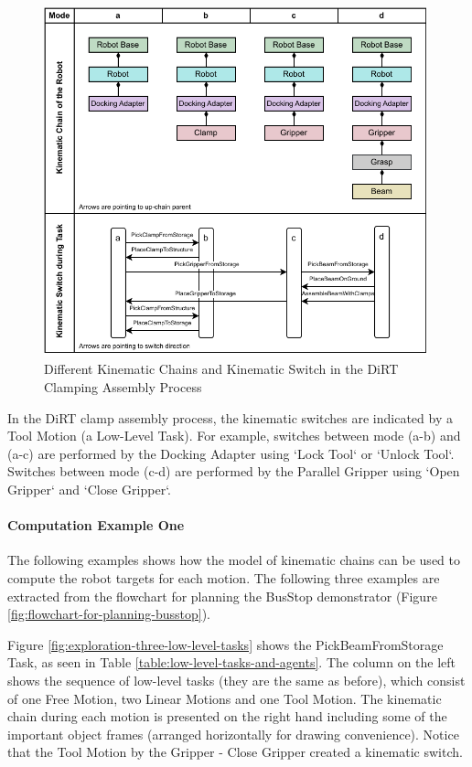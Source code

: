\begin{figure}[!h]
    \centering
    \includegraphics[width=0.99\textwidth]{images/6a/kinematic-chain.pdf}
    \caption{Different Kinematic Chains and Kinematic Switch in the DiRT Clamping Assembly Process}
    \label{fig:kinematic-chain-arrangements}
\end{figure}

In the DiRT clamp assembly process, the kinematic switches are indicated by a Tool Motion (a Low-Level Task). For example, switches between mode (a-b) and (a-c) are performed by the Docking Adapter using `Lock Tool` or `Unlock Tool`. Switches between mode (c-d) are performed by the Parallel Gripper using `Open Gripper` and `Close Gripper`.

\FloatBarrier

\paragraph{Computation Example One}

The following examples shows how the model of kinematic chains can be used to compute the robot targets for each motion. The following three examples are extracted from the flowchart for planning the BusStop demonstrator (Figure \ref{fig:flowchart-for-planning-busstop}).

Figure \ref{fig:exploration-three-low-level-tasks} shows the PickBeamFromStorage Task, as seen in Table \ref{table:low-level-tasks-and-agents}. The column on the left shows the sequence of low-level tasks (they are the same as before), which consist of one Free Motion, two Linear Motions and one Tool Motion. The kinematic chain during each motion is presented on the right hand including some of the important object frames (arranged horizontally for drawing convenience). Notice that the Tool Motion by the Gripper - Close Gripper created a kinematic switch.

